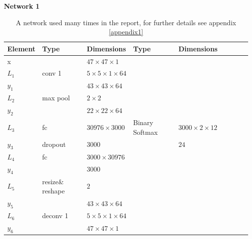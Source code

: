     \begin{table}[h!] \caption*{\textbf{Network 1}}
    \centering
    {\footnotesize
    \begin{tabular}{|lllllllll|}
    \hline
    \multicolumn{1}{|l|}{Element} & Type     & \multicolumn{1}{l|}{Dimensions}                     & Type     & \multicolumn{1}{l|}{Dimensions}  \\ \hline
    \multicolumn{1}{|l|}{x}       &          & \multicolumn{1}{l|}{$47\times47\times1$}            &          & \multicolumn{1}{l|}{}            \\ \hline
    \multicolumn{1}{|l|}{$L_1$}   & conv 1   & \multicolumn{1}{l|}{$5\times 5\times1\times 64$}    &          & \multicolumn{1}{l|}{}            \\
    \multicolumn{1}{|l|}{$y_1$}   &          & \multicolumn{1}{l|}{$43\times43\times64$}           &          & \multicolumn{1}{l|}{}            \\ \hline
    \multicolumn{1}{|l|}{$L_2$}   & max pool & \multicolumn{1}{l|}{$2\times 2$}                    &          & \multicolumn{1}{l|}{}            \\
    \multicolumn{1}{|l|}{$y_2$}   &          & \multicolumn{1}{l|}{$22\times22\times 64$}          &          & \multicolumn{1}{l|}{}            \\ \hline
    \multicolumn{1}{|l|}{$L_3$}   & fc       & \multicolumn{1}{l|}{$30976\times3000$}              & Binary
                                                                                                      Softmax & \multicolumn{1}{l|}{$3000\times2\times12$}        \\
    \multicolumn{1}{|l|}{$y_3$}   & dropout  & \multicolumn{1}{l|}{$3000$}                         &          & \multicolumn{1}{l|}{$24$}        \\ \hline
    \multicolumn{1}{|l|}{$L_4$}   & fc       & \multicolumn{1}{l|}{$3000\times30976$}              &          & \multicolumn{1}{l|}{}            \\
    \multicolumn{1}{|l|}{$y_4$}   &          & \multicolumn{1}{l|}{$3000$}                         &          & \multicolumn{1}{l|}{}            \\ \hline
    \multicolumn{1}{|l|}{$L_5$}   & resize\& reshape & \multicolumn{1}{l|}{$2$}                    &          & \multicolumn{1}{l|}{}            \\
    \multicolumn{1}{|l|}{$y_5$}   &          & \multicolumn{1}{l|}{$43\times43\times 64$}          &          & \multicolumn{1}{l|}{}            \\ \hline
    \multicolumn{1}{|l|}{$L_6$}   & deconv 1   & \multicolumn{1}{l|}{$5\times 5\times1\times 64$}  &          & \multicolumn{1}{l|}{}            \\
    \multicolumn{1}{|l|}{$y_6$}   &          & \multicolumn{1}{l|}{$47\times47\times1$}            &          & \multicolumn{1}{l|}{}             \\ \hline
    \end{tabular}

    \caption{A network used many times in the report, for further details see appendix \ref{appendix1}} \label{compnet}

    }
    \end{table}

